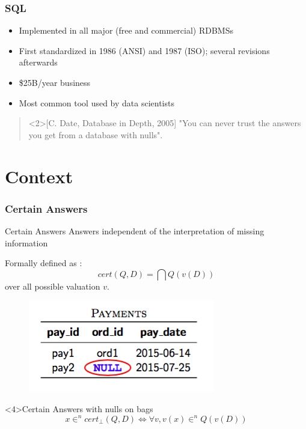 \documentclass{beamer}
\begin{document}
	\begin{frame}
		\frametitle{SQL}
		\begin{itemize}
			\item Implemented in all major (free and commercial) RDBMSs
			\item First standardized in 1986 (ANSI) and 1987 (ISO); several revisions afterwards
			\item \$25B/year business
			\item Most common tool used by data scientists
		\end{itemize}
		\bigskip
		\begin{quote}<2>[C. Date, Database in Depth, 2005] "You can never trust the answers you get from a database with nulls". 
		\end{quote}	
		\end{frame}
		
		\section{Context}
		
		\begin{frame}
			\frametitle{Certain Answers}
			\begin{block}{Certain Answers}
				Answers independent of the interpretation of missing information
			\end{block}
			\pause
			Formally defined as :
			 $$ cert(Q, D) = \bigcap{Q(v(D))} $$
			 over all possible valuation $v$.
			 \pause
			 \begin{figure}
			 	\includegraphics[scale=0.4]{pay}
			 \end{figure}
			 \begin{block}<4>{Certain Answers with nulls on bags}
			 	$$ x\in^n cert_\bot(Q,D) \iff \forall v, v(x) \in^n Q(v(D))$$
			 \end{block}
		\end{frame}
		
\end{document}
